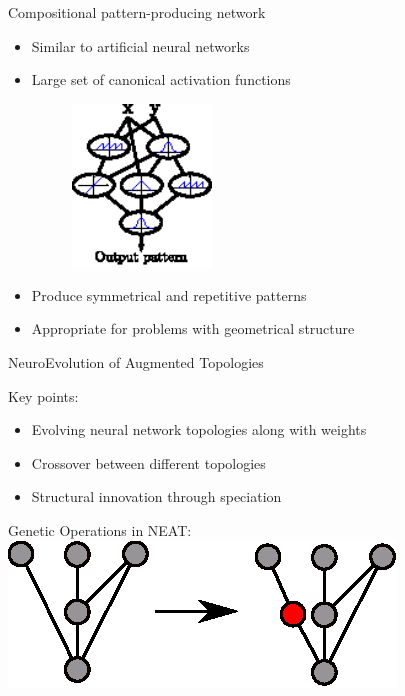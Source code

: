 \documentclass[6pt]{beamer}
\begin{document}
\begin{frame}{Compositional pattern-producing network~}
\begin{itemize}
\item Similar to artificial neural networks
\item Large set of canonical activation functions
\begin{figure}
\begin{center}
\includegraphics[width=0.35\textwidth]{../Figures/Misc/cppnNetwork.eps}
\end{center}
\end{figure}
\item Produce symmetrical and repetitive patterns
\item Appropriate for problems with geometrical structure
\end{itemize}
\end{frame}

\begin{frame}{NeuroEvolution of Augmented Topologies~}
\begin{block}{Key points:}
\begin{itemize}
\item Evolving neural network topologies along with weights
\item Crossover between different topologies
\item Structural innovation through speciation
\end{itemize}
\end{block}
\begin{block}{Genetic Operations in NEAT:}
\centering
\includegraphics[height=0.25\textheight]{../Figures/Misc/neatAddNode.eps}
\end{block}
\end{frame}
\end{document}

